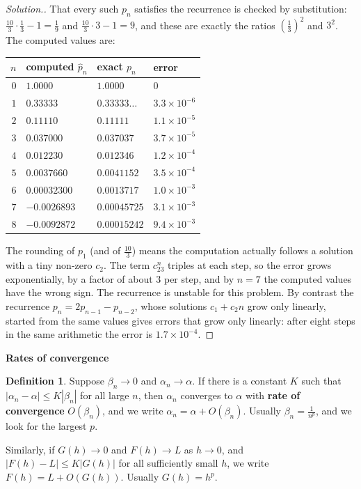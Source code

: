 \documentclass[11pt,a4paper]{article}
\numberwithin{equation}{section}
\theoremstyle{definition}
\newtheorem{defn}[thm]{Definition}
\newenvironment{solution}
  {\renewcommand{\qedsymbol}{}\begin{proof}[\textit{Solution}.]}
  {\end{proof}}
\newcommand{\subhead}[1]{%
  \par\medskip\noindent\textbf{#1}\par\nobreak\smallskip}
\begin{document}
\begin{solution}
That every such $p_n$ satisfies the recurrence is checked by substitution: $\frac{10}3\cdot\frac13 - 1 = \frac19$ and $\frac{10}3\cdot3-1 =
9$, and these are exactly the ratios $\left(\frac13\right)^2$ and $3^2$. The computed values are:
\begin{center}
\begin{tabular}{rlll}
\hline
$n$ & computed $\hat p_n$ & exact $p_n$ & error\\
\hline
$0$ & $1.0000$ & $1.0000$ & $0$\\
$1$ & $0.33333$ & $0.33333\ldots$ & $3.3\times10^{-6}$\\
$2$ & $0.11110$ & $0.11111$ & $1.1\times10^{-5}$\\
$3$ & $0.037000$ & $0.037037$ & $3.7\times10^{-5}$\\
$4$ & $0.012230$ & $0.012346$ & $1.2\times10^{-4}$\\
$5$ & $0.0037660$ & $0.0041152$ & $3.5\times10^{-4}$\\
$6$ & $0.00032300$ & $0.0013717$ & $1.0\times10^{-3}$\\
$7$ & $-0.0026893$ & $0.00045725$ & $3.1\times10^{-3}$\\
$8$ & $-0.0092872$ & $0.00015242$ & $9.4\times10^{-3}$\\
\hline
\end{tabular}
\end{center}
The rounding of $p_1$ (and of $\frac{10}{3}$) means the computation actually follows a solution with a tiny non-zero $c_2$. The term
$c_23^n$ triples at each step, so the error grows exponentially, by a factor of about $3$ per step, and by $n = 7$ the computed values
have the wrong sign. The recurrence is unstable for this problem. By contrast the recurrence $p_n = 2p_{n-1}-p_{n-2}$, whose solutions
$c_1+c_2n$ grow only linearly, started from the same values gives errors that grow only linearly: after eight steps in the same
arithmetic the error is $1.7\times10^{-4}$.
\end{solution}

\subhead{Rates of convergence}

\begin{defn}
Suppose $\beta_n\longrightarrow0$ and $\alpha_n\longrightarrow\alpha$. If there is a constant $K$ such that $|\alpha_n-\alpha|\leq
K|\beta_n|$ for all large $n$, then $\alpha_n$ converges to $\alpha$ with \textbf{rate of convergence} $O(\beta_n)$, and we write
$\alpha_n = \alpha+O(\beta_n)$. Usually $\beta_n = \frac{1}{n^p}$, and we look for the largest $p$.

Similarly, if $G(h)\longrightarrow0$ and $F(h)\longrightarrow L$ as $h\longrightarrow0$, and $|F(h)-L|\leq K|G(h)|$ for all sufficiently
small $h$, we write $F(h) = L+O(G(h))$. Usually $G(h) = h^p$.
\end{defn}
\end{document}
